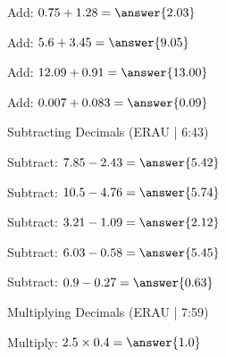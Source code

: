 \documentclass{ximera}
\begin{document}
\begin{problem}
Add: $0.75 + 1.28 = \answer{2.03}$
\end{problem}

\begin{problem}
Add: $5.6 + 3.45 = \answer{9.05}$
\end{problem}

\begin{problem}
Add: $12.09 + 0.91 = \answer{13.00}$
\end{problem}

\begin{problem}
Add: $0.007 + 0.083 = \answer{0.09}$
\end{problem}


\begin{problem}
Subtracting Decimals (ERAU | 6:43)


\end{problem}


\begin{problem}
Subtract: $7.85 - 2.43 = \answer{5.42}$
\end{problem}

\begin{problem}
Subtract: $10.5 - 4.76 = \answer{5.74}$
\end{problem}

\begin{problem}
Subtract: $3.21 - 1.09 = \answer{2.12}$
\end{problem}

\begin{problem}
Subtract: $6.03 - 0.58 = \answer{5.45}$
\end{problem}

\begin{problem}
Subtract: $0.9 - 0.27 = \answer{0.63}$
\end{problem}


\begin{problem}
Multiplying Decimals (ERAU | 7:59)


\end{problem}


\begin{problem}
Multiply: $2.5 \times 0.4 = \answer{1.0}$
\end{problem}
\end{document}
